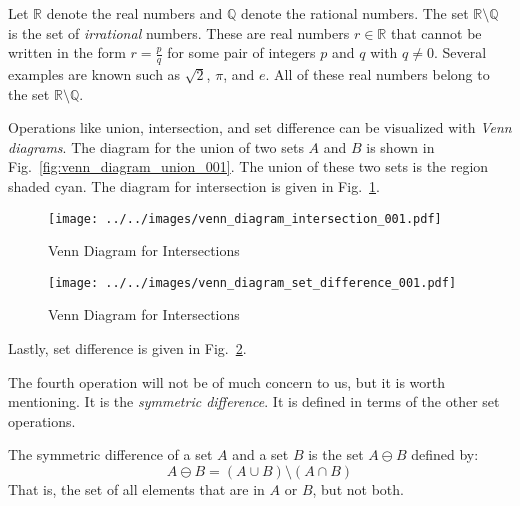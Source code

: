             \begin{example}
                Let $\mathbb{R}$ denote the real numbers and $\mathbb{Q}$ denote
                the rational numbers. The set $\mathbb{R}\setminus\mathbb{Q}$ is
                the set of \textit{irrational} numbers. These are real numbers
                $r\in\mathbb{R}$ that cannot be written in the form
                $r=\frac{p}{q}$ for some pair of integers $p$ and $q$ with
                $q\ne{0}$. Several examples are known such as
                $\sqrt{2}$, $\pi$, and $e$. All of these real numbers belong to
                the set $\mathbb{R}\setminus\mathbb{Q}$.
            \end{example}
            Operations like union, intersection, and set difference can be
            visualized with \textit{Venn diagrams}. The diagram for the union
            of two sets $A$ and $B$ is shown in
            Fig.~\ref{fig:venn_diagram_union_001}. The union of these two sets
            is the region shaded cyan. The diagram for intersection is given
            in Fig.~\ref{fig:venn_diagram_intersection_001}.
            \begin{figure}[H]
                \centering
                \texttt{[image: ../../images/venn\_diagram\_intersection\_001.pdf]}
                \caption{Venn Diagram for Intersections}
                \label{fig:venn_diagram_intersection_001}
            \end{figure}
            \begin{figure}
                \centering
                \texttt{[image: ../../images/venn\_diagram\_set\_difference\_001.pdf]}
                \caption{Venn Diagram for Intersections}
                \label{fig:venn_diagram_set_difference_001}
            \end{figure}
            Lastly, set difference is given in
            Fig.~\ref{fig:venn_diagram_set_difference_001}.
            \par\hfill\par
            The fourth operation will not be of much concern to us, but it is
            worth mentioning. It is the \textit{symmetric difference}. It is
            defined in terms of the other set operations.
            \begin{definition}
                The symmetric difference of a set $A$ and a set $B$ is the
                set $A\ominus{B}$ defined by:
                \begin{equation}
                    A\ominus{B}=(A\cup{B})\setminus(A\cap{B})
                \end{equation}
                That is, the set of all elements that are in $A$ or $B$, but
                not both.
            \end{definition}
